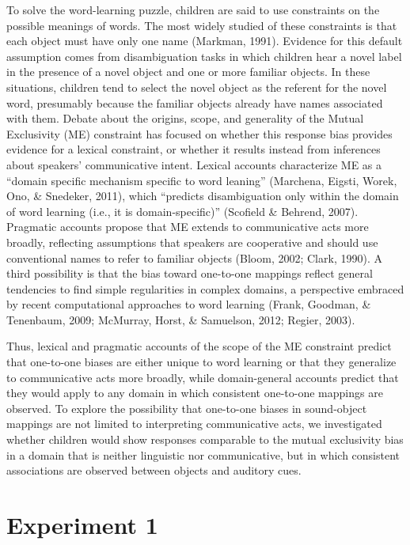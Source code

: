 \documentclass[english,floatsintext,man]{apa6}
\theoremstyle{definition}
\theoremstyle{definition}
\theoremstyle{definition}
\theoremstyle{remark}
\begin{document}
To solve the word-learning puzzle, children are said to use constraints
on the possible meanings of words. The most widely studied of these
constraints is that each object must have only one name (Markman, 1991).
Evidence for this default assumption comes from disambiguation tasks in
which children hear a novel label in the presence of a novel object and
one or more familiar objects. In these situations, children tend to
select the novel object as the referent for the novel word, presumably
because the familiar objects already have names associated with them.
Debate about the origins, scope, and generality of the Mutual
Exclusivity (ME) constraint has focused on whether this response bias
provides evidence for a lexical constraint, or whether it results
instead from inferences about speakers' communicative intent. Lexical
accounts characterize ME as a \enquote{domain specific mechanism
specific to word leaning} (Marchena, Eigsti, Worek, Ono, \& Snedeker,
2011), which \enquote{predicts disambiguation only within the domain of
word learning (i.e., it is domain-specific)} (Scofield \& Behrend,
2007). Pragmatic accounts propose that ME extends to communicative acts
more broadly, reflecting assumptions that speakers are cooperative and
should use conventional names to refer to familiar objects (Bloom, 2002;
Clark, 1990). A third possibility is that the bias toward one-to-one
mappings reflect general tendencies to find simple regularities in
complex domains, a perspective embraced by recent computational
approaches to word learning (Frank, Goodman, \& Tenenbaum, 2009;
McMurray, Horst, \& Samuelson, 2012; Regier, 2003).

Thus, lexical and pragmatic accounts of the scope of the ME constraint
predict that one-to-one biases are either unique to word learning or
that they generalize to communicative acts more broadly, while
domain-general accounts predict that they would apply to any domain in
which consistent one-to-one mappings are observed. To explore the
possibility that one-to-one biases in sound-object mappings are not
limited to interpreting communicative acts, we investigated whether
children would show responses comparable to the mutual exclusivity bias
in a domain that is neither linguistic nor communicative, but in which
consistent associations are observed between objects and auditory cues.

\hypertarget{experiment-1}{%
\section{Experiment 1}\label{experiment-1}}
\end{document}
